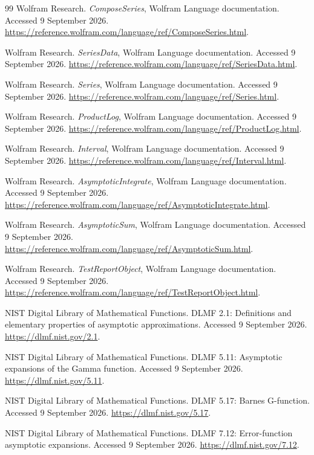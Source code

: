 \begin{thebibliography}{99}
 Wolfram Research. \emph{ComposeSeries}, Wolfram Language documentation. Accessed 9 September 2026. \url{https://reference.wolfram.com/language/ref/ComposeSeries.html}.

 Wolfram Research. \emph{SeriesData}, Wolfram Language documentation. Accessed 9 September 2026. \url{https://reference.wolfram.com/language/ref/SeriesData.html}.

 Wolfram Research. \emph{Series}, Wolfram Language documentation. Accessed 9 September 2026. \url{https://reference.wolfram.com/language/ref/Series.html}.

 Wolfram Research. \emph{ProductLog}, Wolfram Language documentation. Accessed 9 September 2026. \url{https://reference.wolfram.com/language/ref/ProductLog.html}.

 Wolfram Research. \emph{Interval}, Wolfram Language documentation. Accessed 9 September 2026. \url{https://reference.wolfram.com/language/ref/Interval.html}.

 Wolfram Research. \emph{AsymptoticIntegrate}, Wolfram Language documentation. Accessed 9 September 2026. \url{https://reference.wolfram.com/language/ref/AsymptoticIntegrate.html}.

 Wolfram Research. \emph{AsymptoticSum}, Wolfram Language documentation. Accessed 9 September 2026. \url{https://reference.wolfram.com/language/ref/AsymptoticSum.html}.

 Wolfram Research. \emph{TestReportObject}, Wolfram Language documentation. Accessed 9 September 2026. \url{https://reference.wolfram.com/language/ref/TestReportObject.html}.

 NIST Digital Library of Mathematical Functions. DLMF 2.1: Definitions and elementary properties of asymptotic approximations. Accessed 9 September 2026. \url{https://dlmf.nist.gov/2.1}.

 NIST Digital Library of Mathematical Functions. DLMF 5.11: Asymptotic expansions of the Gamma function. Accessed 9 September 2026. \url{https://dlmf.nist.gov/5.11}.

 NIST Digital Library of Mathematical Functions. DLMF 5.17: Barnes G-function. Accessed 9 September 2026. \url{https://dlmf.nist.gov/5.17}.

 NIST Digital Library of Mathematical Functions. DLMF 7.12: Error-function asymptotic expansions. Accessed 9 September 2026. \url{https://dlmf.nist.gov/7.12}.

\end{thebibliography}

